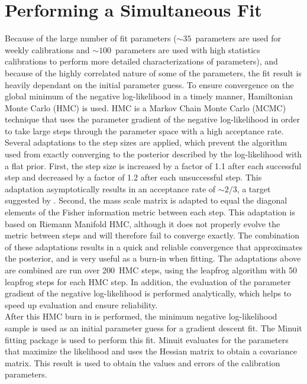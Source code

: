 \documentclass[/main.tex]{subfiles}
\begin{document}
\section{Performing a Simultaneous Fit} \label{sec:fitter}
Because of the large number of fit parameters ($\sim35$~parameters are used for weekly calibrations and $\sim100$~parameters are used with high statistics calibrations to perform more detailed characterizations of parameters), and because of the highly correlated nature of some of the parameters, the fit result is heavily dependant on the initial parameter guess.
To ensure convergence on the global minimum of the negative log-likelihood in a timely manner, Hamiltonian Monte Carlo (HMC) is used\cite{DUANE1987}\cite{2012Neal}.
HMC is a Markov Chain Monte Carlo (MCMC) technique that uses the parameter gradient of the negative log-likelihood in order to take large steps through the parameter space with a high acceptance rate.
Several adaptations to the step sizes are applied, which prevent the algorithm used from exactly converging to the posterior described by the log-likelihood with a flat prior.
First, the step size is increased by a factor of 1.1 after each successful step and decreased by a factor of 1.2 after each unsuccessful step.
This adaptation asymptotically results in an acceptance rate of $\sim2/3$, a target suggested by \cite{2012Neal}.
Second, the mass scale matrix is adapted to equal the diagonal elements of the Fisher information metric between each step.
This adaptation is based on Riemann Manifold HMC\cite{Girolami2011}, although it does not properly evolve the metric between steps and will therefore fail to converge exactly.
The combination of these adaptations results in a quick and reliable convergence that approximates the posterior, and is very useful as a burn-in when fitting.
The adaptations above are combined are run over 200~HMC steps, using the leapfrog algorithm with 50 leapfrog steps for each HMC step.
In addition, the evaluation of the parameter gradient of the negative log-likelihood is performed analytically, which helps to speed up evaluation and ensure reliability.
\\
After this HMC burn in is performed, the minimum negative log-likelihood sample is used as an initial parameter guess for a gradient descent fit.
The Minuit fitting package is used to perform this fit\cite{minuit}.
Minuit evaluates for the parameters that maximize the likelihood and uses the Hessian matrix to obtain a covariance matrix.
This result is used to obtain the values and errors of the calibration parameters.
\\
\end{document}
